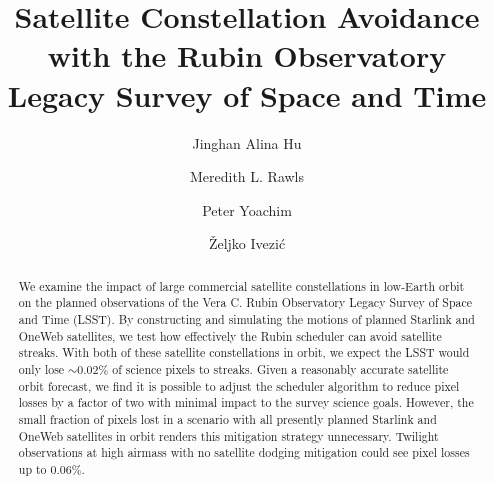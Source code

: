 \documentclass[linenumbers]{aastex631}
\begin{document}
\title{Satellite Constellation Avoidance with the Rubin Observatory Legacy Survey of Space and Time}

\author[0000-0002-8400-1910]{Jinghan Alina Hu}
\author[0000-0003-1305-7308]{Meredith L. Rawls}
\author[0000-0003-2874-6464]{Peter Yoachim}
\author[0000-0001-5250-2633]{\v{Z}eljko Ivezi\'{c}}

\begin{abstract}
We examine the impact of large commercial satellite constellations in low-Earth orbit on the planned observations of the Vera C. Rubin Observatory Legacy Survey of Space and Time (LSST). By constructing and simulating the motions of planned Starlink and OneWeb satellites, we test how effectively the Rubin scheduler can avoid satellite streaks. With both of these satellite constellations in orbit, we expect the LSST would only lose $\sim$0.02\% of science pixels to streaks. Given a reasonably accurate satellite orbit forecast, we find it is possible to adjust the scheduler algorithm to reduce pixel losses by a factor of two with minimal impact to the survey science goals. However, the small fraction of pixels lost in a scenario with all presently planned Starlink and OneWeb satellites in orbit renders this mitigation strategy unnecessary. Twilight observations at high airmass with no satellite dodging mitigation could see pixel losses up to 0.06\%. 
\end{abstract}

\end{document}
